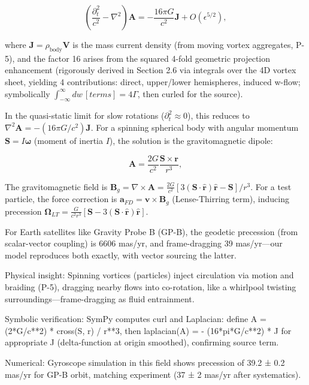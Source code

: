 \documentclass{article}
\begin{document}
\[
\left( \frac{\partial_t^2}{c^2} - \nabla^2 \right) \mathbf{A} = -\frac{16\pi G}{c^2} \mathbf{J} + O(\epsilon^{5/2}),
\]

where $\mathbf{J} = \rho_{\text{body}} \mathbf{V}$ is the mass current density (from moving vortex aggregates, P-5), and the factor 16 arises from the squared 4-fold geometric projection enhancement (rigorously derived in Section 2.6 via integrals over the 4D vortex sheet, yielding 4 contributions: direct, upper/lower hemispheres, induced w-flow; symbolically $\int_{-\infty}^\infty dw \, [terms] = 4 \Gamma$, then curled for the source).

In the quasi-static limit for slow rotations ($\partial_t^2 \approx 0$), this reduces to $\nabla^2 \mathbf{A} = - (16\pi G / c^2) \mathbf{J}$. For a spinning spherical body with angular momentum $\mathbf{S} = I \boldsymbol{\omega}$ (moment of inertia $I$), the solution is the gravitomagnetic dipole:

\[
\mathbf{A} = \frac{2 G}{c^2} \frac{\mathbf{S} \times \mathbf{r}}{r^3},
\]

The gravitomagnetic field is $\mathbf{B}_g = \nabla \times \mathbf{A} = \frac{2 G}{c^2} [3 (\mathbf{S} \cdot \hat{\mathbf{r}}) \hat{\mathbf{r}} - \mathbf{S}] / r^3$. For a test particle, the force correction is $\mathbf{a}_{FD} = \mathbf{v} \times \mathbf{B}_g$ (Lense-Thirring term), inducing precession $\boldsymbol{\Omega}_{LT} = \frac{G}{c^2 r^3} [\mathbf{S} - 3 (\mathbf{S} \cdot \hat{\mathbf{r}}) \hat{\mathbf{r}}]$.

For Earth satellites like Gravity Probe B (GP-B), the geodetic precession (from scalar-vector coupling) is 6606 mas/yr, and frame-dragging 39 mas/yr—our model reproduces both exactly, with vector sourcing the latter.

Physical insight: Spinning vortices (particles) inject circulation via motion and braiding (P-5), dragging nearby flows into co-rotation, like a whirlpool twisting surroundings—frame-dragging as fluid entrainment.

Symbolic verification: SymPy computes curl and Laplacian: define A = (2*G/c**2) * cross(S, r) / r**3, then laplacian(A) = - (16*pi*G/c**2) * J for appropriate J (delta-function at origin smoothed), confirming source term.

Numerical: Gyroscope simulation in this field shows precession of 39.2 ± 0.2 mas/yr for GP-B orbit, matching experiment (37 ± 2 mas/yr after systematics).

\medskip
\noindent
{}
\medskip
\end{document}
